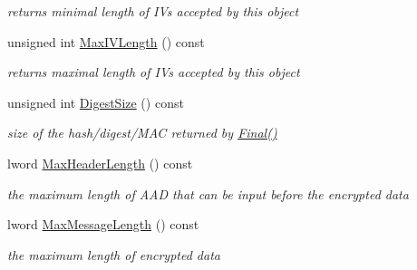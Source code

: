 \begin{DoxyCompactItemize}
\begin{DoxyCompactList}\small\item\em returns minimal length of IVs accepted by this object \item\end{DoxyCompactList}\item 
\hypertarget{class_g_c_m___base_a7b188a38b51a537a43b326f3427732bf}{
unsigned int \hyperlink{class_g_c_m___base_a7b188a38b51a537a43b326f3427732bf}{MaxIVLength} () const }
\label{class_g_c_m___base_a7b188a38b51a537a43b326f3427732bf}

\begin{DoxyCompactList}\small\item\em returns maximal length of IVs accepted by this object \item\end{DoxyCompactList}\item 
\hypertarget{class_g_c_m___base_a615b62ef38032b9a748f97d3d3f29e05}{
unsigned int \hyperlink{class_g_c_m___base_a615b62ef38032b9a748f97d3d3f29e05}{DigestSize} () const }
\label{class_g_c_m___base_a615b62ef38032b9a748f97d3d3f29e05}

\begin{DoxyCompactList}\small\item\em size of the hash/digest/MAC returned by \hyperlink{class_hash_transformation_aa0b8c7a110d8968268fd02ec32b9a8e8}{Final()} \item\end{DoxyCompactList}\item 
\hypertarget{class_g_c_m___base_a7a2d40ae24883abdd573296d15d8aa28}{
lword \hyperlink{class_g_c_m___base_a7a2d40ae24883abdd573296d15d8aa28}{MaxHeaderLength} () const }
\label{class_g_c_m___base_a7a2d40ae24883abdd573296d15d8aa28}

\begin{DoxyCompactList}\small\item\em the maximum length of AAD that can be input before the encrypted data \item\end{DoxyCompactList}\item 
\hypertarget{class_g_c_m___base_a076b895cf8bf283d04abbe6077584e18}{
lword \hyperlink{class_g_c_m___base_a076b895cf8bf283d04abbe6077584e18}{MaxMessageLength} () const }
\label{class_g_c_m___base_a076b895cf8bf283d04abbe6077584e18}

\begin{DoxyCompactList}\small\item\em the maximum length of encrypted data \item\end{DoxyCompactList}\end{DoxyCompactItemize}
